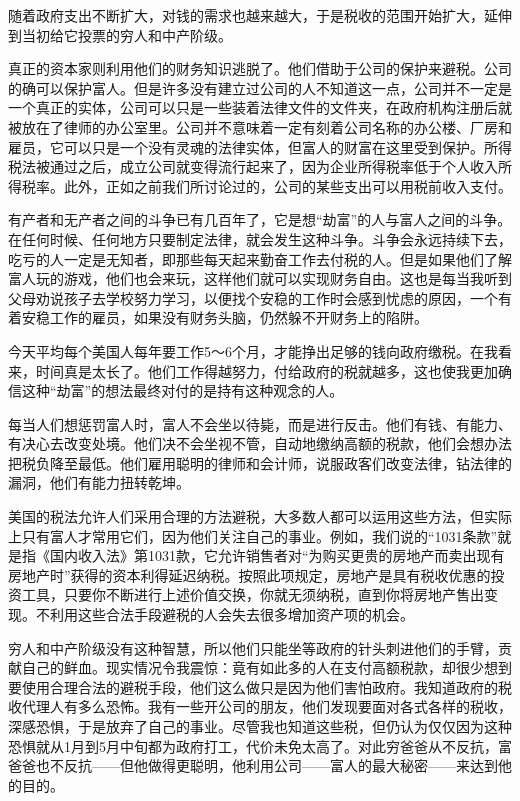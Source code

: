 随着政府支出不断扩大，对钱的需求也越来越大，于是税收的范围开始扩大，延伸到当初给它投票的穷人和中产阶级。

真正的资本家则利用他们的财务知识逃脱了。他们借助于公司的保护来避税。公司的确可以保护富人。但是许多没有建立过公司的人不知道这一点，公司并不一定是一个真正的实体，公司可以只是一些装着法律文件的文件夹，在政府机构注册后就被放在了律师的办公室里。公司并不意味着一定有刻着公司名称的办公楼、厂房和雇员，它可以只是一个没有灵魂的法律实体，但富人的财富在这里受到保护。所得税法被通过之后，成立公司就变得流行起来了，因为企业所得税率低于个人收入所得税率。此外，正如之前我们所讨论过的，公司的某些支出可以用税前收入支付。

有产者和无产者之间的斗争已有几百年了，它是想“劫富”的人与富人之间的斗争。在任何时候、任何地方只要制定法律，就会发生这种斗争。斗争会永远持续下去，吃亏的人一定是无知者，即那些每天起来勤奋工作去付税的人。但是如果他们了解富人玩的游戏，他们也会来玩，这样他们就可以实现财务自由。这也是每当我听到父母劝说孩子去学校努力学习，以便找个安稳的工作时会感到忧虑的原因，一个有着安稳工作的雇员，如果没有财务头脑，仍然躲不开财务上的陷阱。

今天平均每个美国人每年要工作5～6个月，才能挣出足够的钱向政府缴税。在我看来，时间真是太长了。他们工作得越努力，付给政府的税就越多，这也使我更加确信这种“劫富”的想法最终对付的是持有这种观念的人。

每当人们想惩罚富人时，富人不会坐以待毙，而是进行反击。他们有钱、有能力、有决心去改变处境。他们决不会坐视不管，自动地缴纳高额的税款，他们会想办法把税负降至最低。他们雇用聪明的律师和会计师，说服政客们改变法律，钻法律的漏洞，他们有能力扭转乾坤。

美国的税法允许人们采用合理的方法避税，大多数人都可以运用这些方法，但实际上只有富人才常用它们，因为他们关注自己的事业。例如，我们说的“1031条款”就是指《国内收入法》第1031款，它允许销售者对“为购买更贵的房地产而卖出现有房地产时”获得的资本利得延迟纳税。按照此项规定，房地产是具有税收优惠的投资工具，只要你不断进行上述价值交换，你就无须纳税，直到你将房地产售出变现。不利用这些合法手段避税的人会失去很多增加资产项的机会。

穷人和中产阶级没有这种智慧，所以他们只能坐等政府的针头刺进他们的手臂，贡献自己的鲜血。现实情况令我震惊：竟有如此多的人在支付高额税款，却很少想到要使用合理合法的避税手段，他们这么做只是因为他们害怕政府。我知道政府的税收代理人有多么恐怖。我有一些开公司的朋友，他们发现要面对各式各样的税收，深感恐惧，于是放弃了自己的事业。尽管我也知道这些税，但仍认为仅仅因为这种恐惧就从1月到5月中旬都为政府打工，代价未免太高了。对此穷爸爸从不反抗，富爸爸也不反抗——但他做得更聪明，他利用公司——富人的最大秘密——来达到他的目的。

